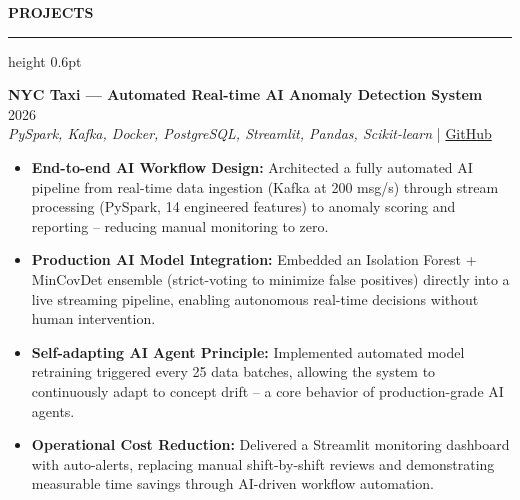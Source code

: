 ﻿\documentclass{resume}
\renewcommand{\sectionskip}{\vspace{5pt}}
\renewcommand{\sectionlineskip}{\vspace{3pt}}
\renewenvironment{rSection}[1]{
  \sectionskip
  {\color{headerblue}\textbf{\MakeUppercase{#1}}}
  \sectionlineskip
  {\color{rulegray}\hrule height 0.6pt}
  \vspace{0pt}
  \begin{list}{}{
    \setlength{\leftmargin}{0em}
    \setlength{\topsep}{0pt}
    \setlength{\partopsep}{0pt}
    \setlength{\parsep}{0pt}
    \setlength{\itemsep}{0pt}
  }
  \item[]
}{
  \end{list}
}
\begin{document}
\begin{rSection}{Projects}
    \item \textbf{NYC Taxi — Automated Real-time AI Anomaly Detection System} \hfill 2026\\
    {\small \textit{PySpark, Kafka, Docker, PostgreSQL, Streamlit, Pandas, Scikit-learn}} \hfill | \href{https://github.com/vietpham10205/real-time-Fleet-Intelligence-anomaly-detection-dashboard}{GitHub}
    {\small
    \begin{itemize}[itemsep=4pt, parsep=0pt, leftmargin=1.2em]
        \item \textbf{End-to-end AI Workflow Design:} Architected a fully automated AI pipeline from real-time data ingestion (Kafka at 200 msg/s) through stream processing (PySpark, 14 engineered features) to anomaly scoring and reporting -- reducing manual monitoring to zero.
        \item \textbf{Production AI Model Integration:} Embedded an Isolation Forest + MinCovDet ensemble (strict-voting to minimize false positives) directly into a live streaming pipeline, enabling autonomous real-time decisions without human intervention.
        \item \textbf{Self-adapting AI Agent Principle:} Implemented automated model retraining triggered every 25 data batches, allowing the system to continuously adapt to concept drift -- a core behavior of production-grade AI agents.
        \item \textbf{Operational Cost Reduction:} Delivered a Streamlit monitoring dashboard with auto-alerts, replacing manual shift-by-shift reviews and demonstrating measurable time savings through AI-driven workflow automation.
    \end{itemize}
    }
\end{rSection}
\end{document}
